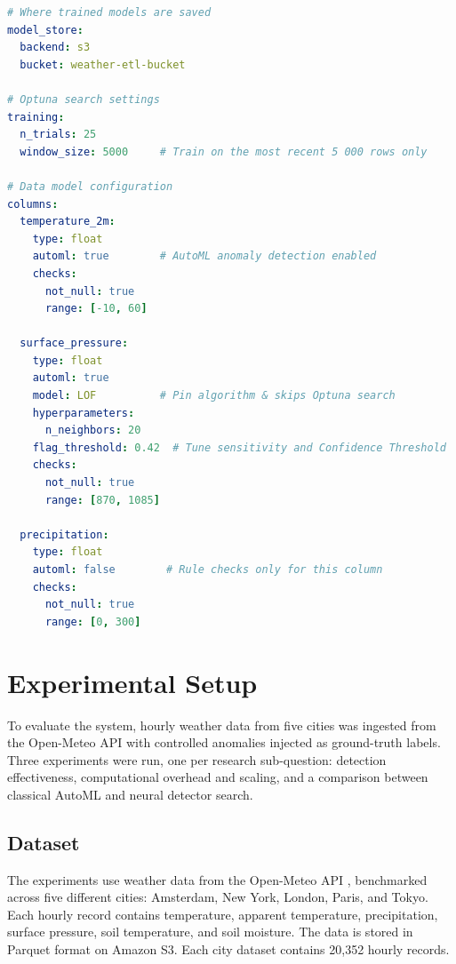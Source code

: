 \documentclass[12pt]{article}
\begin{document}
\begin{lstlisting}[language=yaml, caption={Example \texttt{profiling\_schema.yml}. Each column declares a type and rule-based checks (data contract layer) and optionally enables an AutoML model (\texttt{automl: true}). Optional per-column keys (\texttt{model}, \texttt{hyperparameters}, \texttt{flag\_threshold}) and a global \texttt{window\_size} are also shown.}]
# Where trained models are saved
model_store:
  backend: s3
  bucket: weather-etl-bucket

# Optuna search settings
training:
  n_trials: 25
  window_size: 5000     # Train on the most recent 5 000 rows only

# Data model configuration
columns:
  temperature_2m:
    type: float
    automl: true        # AutoML anomaly detection enabled
    checks:
      not_null: true
      range: [-10, 60]

  surface_pressure:
    type: float
    automl: true
    model: LOF          # Pin algorithm & skips Optuna search
    hyperparameters:
      n_neighbors: 20
    flag_threshold: 0.42  # Tune sensitivity and Confidence Threshold
    checks:
      not_null: true
      range: [870, 1085]

  precipitation:
    type: float
    automl: false        # Rule checks only for this column
    checks:
      not_null: true
      range: [0, 300]

\end{lstlisting}

\section{Experimental Setup}\label{sec:expsetup}

To evaluate the system, hourly weather data from five cities was ingested from the Open-Meteo API with controlled anomalies injected as ground-truth labels. Three experiments were run, one per research sub-question: detection effectiveness, computational overhead and scaling, and a comparison between classical AutoML and neural detector search.

\subsection{Dataset}

The experiments use weather data from the Open-Meteo API \cite{openmeteo2022}, benchmarked across five different cities: Amsterdam, New York, London, Paris, and Tokyo. Each hourly record contains temperature, apparent temperature, precipitation, surface pressure, soil temperature, and soil moisture. The data is stored in Parquet format on Amazon S3. Each city dataset contains 20,352 hourly records.
\end{document}
